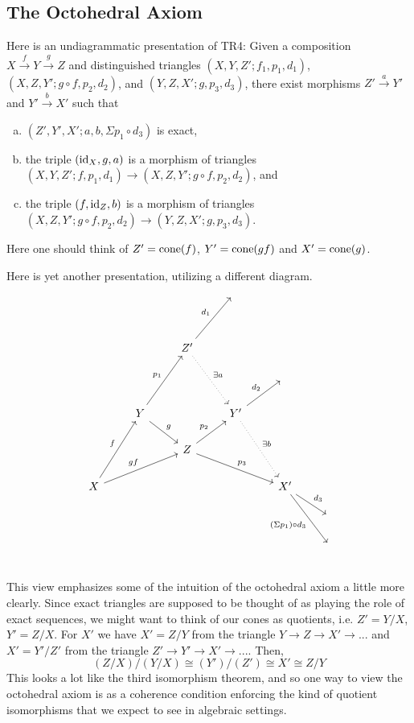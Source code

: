 \documentclass[11pt]{article}
\begin{document}
\subsection{The Octohedral Axiom}\label{octaxiom}
Here is an undiagrammatic presentation of TR4: Given a composition $X \xrightarrow{f} Y \xrightarrow{g} Z$ and distinguished triangles $(X,Y,Z'; f_1, p_1, d_1)$, $(X,Z,Y'; g\circ f, p_2, d_2)$, and $(Y,Z,X'; g, p_3, d_3)$, there exist morphisms $Z' \xrightarrow{a} Y'$ and $Y' \xrightarrow{b} X'$ such that
	\begin{enumerate}[(a)]
		\item $(Z',Y',X'; a,b,\Sigma p_1 \circ d_3)$ is exact,
		\item the triple $(\operatorname{id}_X,g,a)$ is a morphism of triangles $(X,Y,Z'; f,p_1,d_1) \to (X,Z,Y'; g\circ f,p_2,d_2)$, and
		\item the triple $(f,\operatorname{id}_Z,b)$ is a morphism of triangles $(X,Z,Y'; g\circ f, p_2, d_2) \to (Y,Z,X'; g, p_3, d_3)$.
	\end{enumerate}
	Here one should think of $Z' = \operatorname{cone}(f)$, $Y' = \operatorname{cone}(gf)$ and $X' = \operatorname{cone}(g)$.

Here is yet another presentation, utilizing a different diagram. 
\[\begin{tikzcd}
  &   &   & {} & &  \\
  &   &   &   &   &  \\
  &   & Z' \ar[ruu,"d_1"]\ar[ddr,"\exists a",dotted] &   &  &  \\
  &   &   &   & {}  &  \\
  & Y\ar[rd,"g"] \ar[ruu,"p_1"] &   & Y'\ar[ru,"d_2"] \ar[rdd,"\exists b", dotted]&   &  \\
  &   & Z \ar[ru,"p_2"] \ar[drr,"p_3"] &   &   &  \\
X \ar[ruu,"f"]  \ar[urr,"gf"]&   &   &   & X' \ar[rd,"d_3"] \ar[rdd,"(\Sigma p_1) \circ d_3"'] &  \\
  &   &   &   &   & {} \\
  &   &   &   &   & {} \\
\end{tikzcd}\]
This view emphasizes some of the intuition of the octohedral axiom a little more clearly. Since exact triangles are supposed to be thought of as playing the role of exact sequences, we might want to think of our cones as quotients, i.e. $Z' = Y/X$, $Y' = Z/X$. For $X'$ we have $X' = Z/Y$ from the triangle $Y \to Z \to X' \to ... $ and $X' = Y'/Z'$ from the triangle $Z' \to Y' \to X' \to ...$. Then, 
\[
	(Z/X)/(Y/X) \cong (Y')/(Z') \cong X' \cong Z/Y
\]
This looks a lot like the third isomorphism theorem, and so one way to view the octohedral axiom is as a coherence condition enforcing the kind of quotient isomorphisms that we expect to see in algebraic settings.
\end{document}

